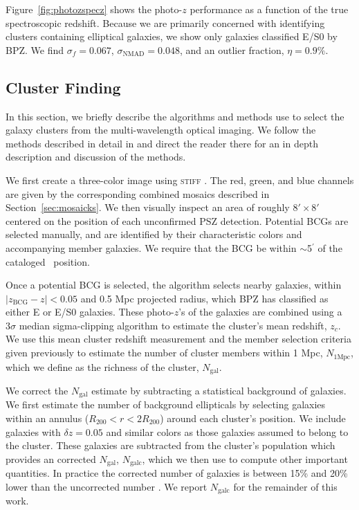 \documentclass[apj, revtex4-1]{emulateapj}
\begin{document}
Figure~\ref{fig:photozspecz} shows the photo-$z$ performance as a function of the true spectroscopic redshift. Because we are primarily concerned with identifying clusters containing elliptical galaxies, we show only galaxies classified E/S0 by BPZ. We find $\sigma_f = 0.067$, $\sigma_\mathrm{NMAD} = 0.048$, and an outlier fraction, $\eta = 0.9\%$.

\subsection{Cluster Finding}
In this section, we briefly describe the algorithms and methods use to select the galaxy clusters from the multi-wavelength optical imaging. We follow the methods described in detail in \cite{Menanteau2009a, Menanteau2010} and direct the reader there for an in depth description and discussion of the methods.

We first create a three-color image using \textsc{stiff} \citep{Bertin2011}. The red, green, and blue channels are given by the corresponding combined mosaics described in Section~\ref{sec:mosaicks}. We then visually inspect an area of roughly $8' \times 8'$ centered on the position of each unconfirmed PSZ detection. Potential BCGs are selected manually, and are identified by their characteristic colors and accompanying member galaxies.  We require that the BCG be within $\sim$5$^\prime$ of the cataloged \planck\ position.


Once a potential BCG is selected, the algorithm selects nearby galaxies, within $|z_\mathrm{BCG} - z| < 0.05$ and 0.5 Mpc projected radius, which BPZ has classified as either E or E/S0 galaxies. These photo-$z$'s of the galaxies are combined using a $3\sigma$ median sigma-clipping algorithm to estimate the cluster's mean redshift, $z_c$. We use this mean cluster redshift measurement and the member selection criteria given previously to estimate the number of cluster members within 1 Mpc, $N_\mathrm{1 Mpc}$, which we define as the richness  of the cluster, $N_\mathrm{gal}$.

We correct the $N_\mathrm{gal}$ estimate by subtracting a statistical background of galaxies. We first estimate the number of background ellipticals by selecting galaxies within an annulus ($R_{200} <r < 2R_{200}$) around each cluster's position. We include galaxies with $\delta z = 0.05$ and similar colors as those galaxies assumed to belong to the cluster. These galaxies are subtracted from the cluster's population which provides an corrected $N_\mathrm{gal}$, $N_\mathrm{galc}$, which we then use to compute other important quantities. In practice the corrected number of galaxies is between 15\% and 20\% lower than the uncorrected number \citep{Menanteau2010}. We report $N_\mathrm{galc}$ for the remainder of this work.
\end{document}
